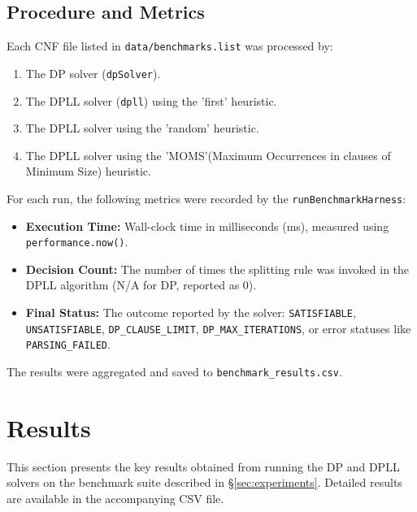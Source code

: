 \documentclass[12pt, a4paper]{article}
\begin{document}
\subsection{Procedure and Metrics}
Each CNF file listed in \texttt{data/benchmarks.list} was processed by:
\begin{enumerate}
    \item The DP solver (\texttt{dpSolver}).
    \item The DPLL solver (\texttt{dpll}) using the 'first' heuristic.
    \item The DPLL solver using the 'random' heuristic.
    \item The DPLL solver using the 'MOMS'(Maximum Occurrences in clauses of Minimum Size) heuristic.
\end{enumerate}
For each run, the following metrics were recorded by the \texttt{runBenchmarkHarness}:
\begin{itemize}
    \item \textbf{Execution Time:} Wall-clock time in milliseconds (ms), measured using \texttt{performance.now()}.
    \item \textbf{Decision Count:} The number of times the splitting rule was invoked in the DPLL algorithm (N/A for DP, reported as 0).
    \item \textbf{Final Status:} The outcome reported by the solver: \texttt{SATISFIABLE}, \texttt{UNSATISFIABLE}, \texttt{DP\_CLAUSE\_LIMIT}, \texttt{DP\_MAX\_ITERATIONS}, or error statuses like \texttt{PARSING\_FAILED}.
\end{itemize}
The results were aggregated and saved to \texttt{benchmark\_results.csv}.

\section{Results}
\label{sec:results}

This section presents the key results obtained from running the DP and DPLL solvers on the benchmark suite described in \S\ref{sec:experiments}. Detailed results are available in the accompanying CSV file.
\end{document}
